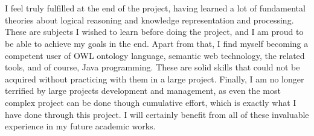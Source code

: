 \\\\
I feel truly fulfilled at the end of the project, having learned a lot of fundamental theories about logical reasoning and knowledge representation and processing. These are subjects I wished to learn before doing the project, and I am proud to be able to achieve my goals in the end. Apart from that, I find myself becoming a competent user of OWL ontology language, semantic web technology, the related tools, and of course, Java programming. These are solid skills that could not be acquired without practicing with them in a large project. Finally, I am no longer terrified by large projects development and management, as even the most complex project can be done though cumulative effort, which is exactly what I have done through this project. I will certainly benefit from all of these invaluable experience in my future academic works.
